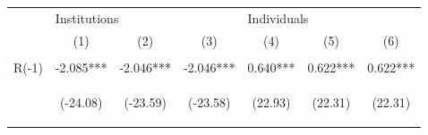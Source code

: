 \documentclass[border=0.2cm]{standalone}
\begin{document}
\begin{tabular}{lcccccc}
                           & \multicolumn{3}{l}{Institutions}               & \multicolumn{3}{l}{Individuals}                                                                                                                                                                                                                     \\
    \cmidrule(l){2-4} \cmidrule(l){5-7}
                           & (1)                                            & (2)                                            & (3)                                            & (4)                                             & (5)                                            & (6)                                            \\
    \toprule
    \vspace{2pt}           & \begin{footnotesize}\end{footnotesize}         & \begin{footnotesize}\end{footnotesize}         & \begin{footnotesize}\end{footnotesize}         & \begin{footnotesize}\end{footnotesize}          & \begin{footnotesize}\end{footnotesize}         & \begin{footnotesize}\end{footnotesize}         \\
    R(-1)                  & -2.085***                                      & -2.046***                                      & -2.046***                                      & 0.640***                                        & 0.622***                                       & 0.622***                                       \\
    \vspace{4pt}           & \begin{footnotesize}(-24.08)\end{footnotesize} & \begin{footnotesize}(-23.59)\end{footnotesize} & \begin{footnotesize}(-23.58)\end{footnotesize} & \begin{footnotesize}(22.93)\end{footnotesize}   & \begin{footnotesize}(22.31)\end{footnotesize}  & \begin{footnotesize}(22.31)\end{footnotesize}  \\

\end{tabular}
\end{document}
